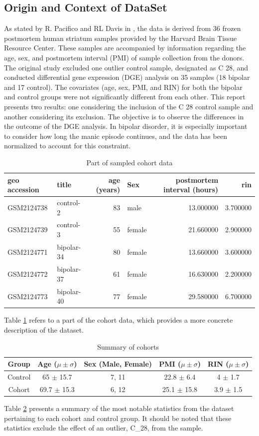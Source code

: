 \documentclass{article}
\begin{document}
\subsection{Origin and Context of DataSet}
As stated by R. Pacifico and RL Davis in \cite{pacifico2017transcriptome}, the data is derived from 36 frozen postmortem human striatum samples provided by the Harvard Brain Tissue Resource Center. These samples are accompanied by information regarding the age, sex, and postmortem interval (PMI) of sample collection from the donors. The original study excluded one outlier control sample, designated as C 28, and conducted differential gene expression (DGE) analysis on 35 samples (18 bipolar and 17 control). The covariates (age, sex, PMI, and RIN) for both the bipolar and control groups were not significantly different from each other. This report presents two results: one considering the inclusion of the C 28 control sample and another considering its exclusion. The objective is to observe the differences in the outcome of the DGE analysis. In bipolar disorder, it is especially important to consider how long the manic episode continues, and the data has been normalized to account for this constraint.
\begin{table}[H]
\centering
\begin{tabular}{llrlrr}
\toprule
geo accession & title & age (years) & Sex & postmortem interval (hours) & rin \\
\midrule
GSM2124738 & control-2 & 83 & male & 13.000000 & 3.700000 \\
GSM2124739 & control-3 & 55 & female & 21.660000 & 2.900000 \\
GSM2124771 & bipolar-34 & 80 & female & 13.660000 & 3.600000 \\
GSM2124772 & bipolar-37 & 61 & female & 16.630000 & 2.200000 \\
GSM2124773 & bipolar-40 & 77 & female & 29.580000 & 6.700000 \\
\bottomrule
\end{tabular}
\caption{Part of sampled cohort data}
\label{tab:metadata_entr}
\end{table}
Table \ref{tab:metadata_entr} refers to a part of the cohort data, which provides a more concrete description of the dataset.
\begin{table}[H]
\centering
\begin{tabular}{ccccc}
\toprule
Group & Age ($\mu \pm \sigma$) & Sex (Male, Female) & PMI ($\mu \pm \sigma$) & RIN ($\mu \pm \sigma$) \\
\midrule
Control & 65 $\pm$ 15.7 & 7, 11 & 22.8 $\pm$ 6.4 & 4 $\pm$ 1.7 \\
Cohort & 69.7 $\pm$ 15.3 & 6, 12 & 25.1 $\pm$ 15.8 & 3.9 $\pm$ 1.5 \\
\bottomrule
\end{tabular}
\caption{Summary of cohorts}
\label{table:cohort_info}
\end{table}
\noindent Table \ref{table:cohort_info} presents a summary of the most notable statistics from the dataset pertaining to each cohort and control group. It should be noted that these statistics exclude the effect of an outlier, C\_28, from the sample.
\end{document}
